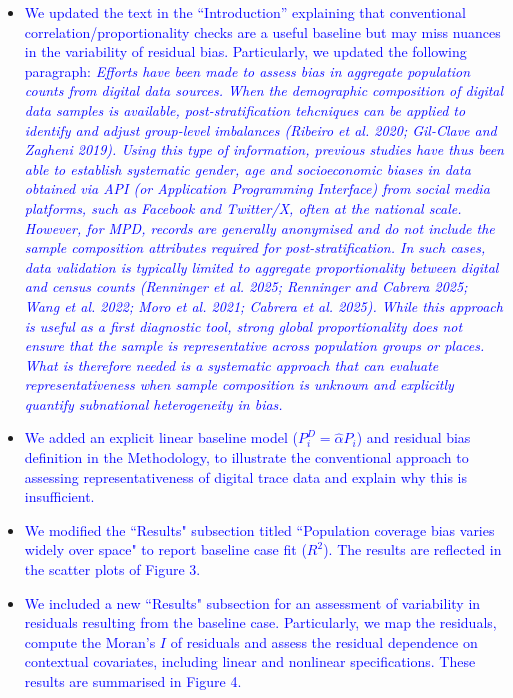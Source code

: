 \documentclass[
  letterpaper,
  DIV=11,
  numbers=noendperiod]{scrartcl}
\begin{document}
\begin{itemize}[noitemsep, topsep=0pt]
\item \textcolor{blue}{We updated the text in the ``Introduction'' explaining that conventional correlation/proportionality checks are a useful baseline but may miss nuances in the variability of residual bias. Particularly, we updated the following paragraph: \textit{Efforts have been made to assess bias in aggregate population counts from digital data sources. When the demographic composition of digital data samples is available, post-stratification tehcniques can be applied to identify and adjust group-level imbalances (Ribeiro et al. 2020; Gil-Clave and Zagheni 2019). Using this type of information, previous studies have thus been able to establish systematic gender, age and socioeconomic biases in data obtained via API (or Application Programming Interface) from social media platforms, such as Facebook and Twitter/X, often at the national scale. However, for MPD, records are generally anonymised and do not include the sample composition attributes required for post-stratification. In such cases, data validation is typically limited to aggregate proportionality between digital and census counts (Renninger et al. 2025; Renninger and Cabrera 2025; Wang et al. 2022; Moro et al. 2021; Cabrera et al. 2025). While this approach is useful as a first diagnostic tool, strong global proportionality does not ensure that the sample is representative across population groups or places. What is therefore needed is a systematic approach that can evaluate representativeness when sample composition is unknown and explicitly quantify subnational heterogeneity in bias.}}
\item \textcolor{blue}{We added an explicit linear baseline model ($P_i^D=\hat{\alpha}P_i$) and residual bias definition in the Methodology, to illustrate the conventional approach to assessing representativeness of digital trace data and explain why this is insufficient.}
\item \textcolor{blue}{We modified the ``Results" subsection titled ``Population coverage bias varies widely over space" to report baseline case fit ($R^2$). The results are reflected in the scatter plots of Figure 3.}
\item \textcolor{blue}{We included a new ``Results" subsection for an assessment of variability in residuals resulting from the baseline case. Particularly, we map the residuals, compute the Moran’s $I$ of residuals and assess the residual dependence on contextual covariates, including linear and nonlinear specifications. These results are summarised in Figure 4.}

\end{itemize}
\end{document}
